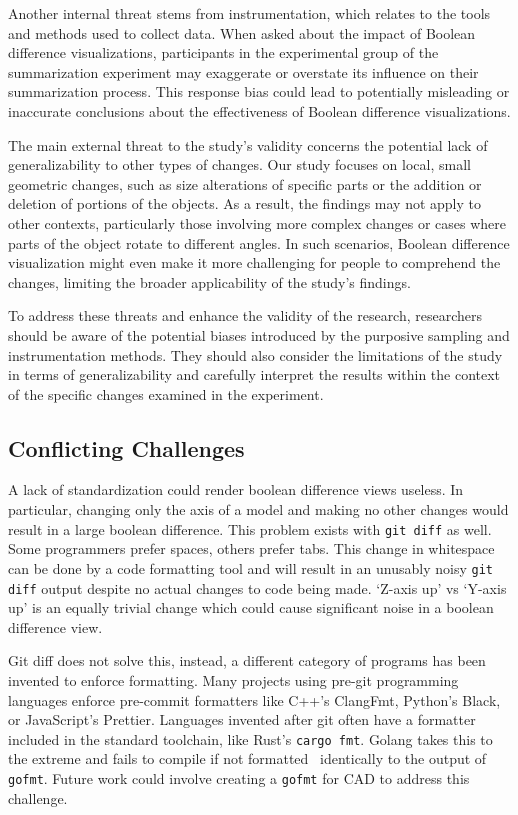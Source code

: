 \documentclass[sigconf,authorversion,nonacm]{acmart}
\begin{document}
Another internal threat stems from instrumentation, which relates to the tools and methods used to collect data.
When asked about the impact of Boolean difference visualizations, participants in the experimental group of the summarization experiment may exaggerate or overstate its influence on their summarization process.
This response bias could lead to potentially misleading or inaccurate conclusions about the effectiveness of Boolean difference visualizations.

The main external threat to the study's validity concerns the potential lack of generalizability to other types of changes. Our study focuses on local, small geometric changes, such as size alterations of specific parts or the addition or deletion of portions of the objects.
As a result, the findings may not apply to other contexts, particularly those involving more complex changes or cases where parts of the object rotate to different angles.
In such scenarios, Boolean difference visualization might even make it more challenging for people to comprehend the changes, limiting the broader applicability of the study's findings.

To address these threats and enhance the validity of the research, researchers should be aware of the potential biases introduced by the purposive sampling and instrumentation methods.
They should also consider the limitations of the study in terms of generalizability and carefully interpret the results within the context of the specific changes examined in the experiment.

\subsection{Conflicting Challenges}

A lack of standardization could render boolean difference views useless.
In particular, changing only the axis of a model and making no other changes would result in a large boolean difference.
This problem exists with \texttt{git diff} as well.
Some programmers prefer spaces, others prefer tabs.
This change in whitespace can be done by a code formatting tool and will result in an unusably noisy \texttt{git diff} output despite no actual changes to code being made.
`Z-axis up' vs `Y-axis up' is an equally trivial change which could cause significant noise in a boolean difference view.

Git diff does not solve this, instead, a different category of programs has been invented to enforce formatting.
Many projects using pre-git programming languages enforce pre-commit formatters like C++'s ClangFmt, Python's Black, or JavaScript's Prettier.
Languages invented after git often have a formatter included in the standard toolchain, like Rust's \texttt{cargo fmt}.
Golang takes this to the extreme and fails to compile if not formatted~\cite{golangfaq} identically to the output of \texttt{gofmt}.
Future work could involve creating a \texttt{gofmt} for CAD to address this challenge.
\end{document}
